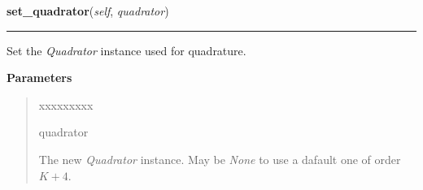 \hspace{.8\funcindent}\begin{boxedminipage}{\funcwidth}

    \raggedright \textbf{set\_quadrator}(\textit{self}, \textit{quadrator})

    \vspace{-1.5ex}

    \rule{\textwidth}{0.5\fboxrule}
\setlength{\parskip}{2ex}
    Set the \textit{Quadrator} instance used for quadrature.

\setlength{\parskip}{1ex}
      \textbf{Parameters}
      \vspace{-1ex}

      \begin{quote}
        \begin{Ventry}{xxxxxxxxx}

          \item[quadrator]

          The new \textit{Quadrator} instance. May be \textit{None} to use
          a dafault one of order $K+4$.

        \end{Ventry}

      \end{quote}

    \end{boxedminipage}

    \label{HagedornMultiWavepacket:HagedornMultiWavepacket:evaluate_base_at}

    \vspace{0.5ex}

